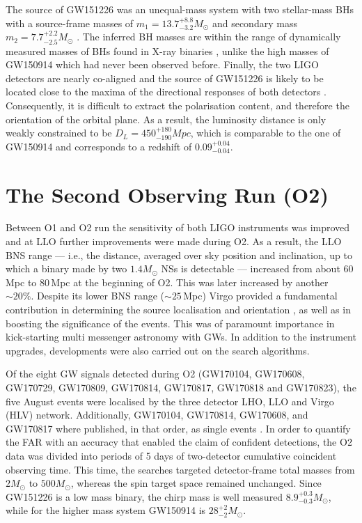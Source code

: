 \documentclass[binding=0.6cm, LaM]{sapthesis}
\begin{document}
	The source of GW151226 was an unequal-mass system with two stellar-mass BHs 
	with a source-frame masses of $m_1 = 13.7^{+8.8}_{-3.2}M_\odot$ 
	and secondary mass $m_2 = 7.7^{+2.2}_{-2.5}M_\odot$ \cite{13}. 
	The inferred BH masses are within the range of dynamically measured masses 
	of BHs found in X-ray binaries \cite{128, 129, 130, 132}, 
	unlike the high masses of GW150914 which had never been observed before. 
	Finally, the two LIGO detectors are nearly co-aligned and the source of GW151226 
	is likely to be located close to the maxima of the directional responses of both detectors \cite{28}. 
	Consequently, it is difficult to extract the polarisation content, and therefore the orientation of the orbital plane. 
	As a result, the luminosity distance is only weakly constrained to be $D_L = 450^{+180}_{-190}Mpc$, 
	which is comparable to the one of GW150914 and corresponds to a redshift of $0.09^{+0.04}_{-0.04}$.


\section{The Second Observing Run (O2)}
	Between O1 and O2 run the sensitivity of both LIGO instruments was improved and 
	at LLO further improvements were made during O2. 
	As a result, the LLO BNS range --- i.e., the distance, averaged over sky position and inclination, 
	up to which a binary made by two $1.4M_\odot$ NSs is detectable --- 
	increased from about 60\,Mpc to 80\,Mpc at the beginning of O2.
	This was later increased by another $\sim 20\%$.
 	Despite its lower BNS range ($\sim 25\,$Mpc) Virgo provided a fundamental contribution 
	in determining the source localisation and orientation \cite{56}, 
	as well as in boosting the significance of the events. 
	This was of paramount importance in kick-starting multi messenger astronomy with GWs.
	In addition to the instrument upgrades, developments were also carried out on
	the search algorithms.
 
	Of the eight GW signals detected during O2 
	(GW170104, GW170608, GW170729, GW170809, GW170814, GW170817, GW170818 and GW170823), 
	the five August events were localised by the three detector LHO, LLO and Virgo (HLV) network.
	Additionally, GW170104, GW170814, GW170608, and GW170817 where published, 
	in that order, as single events \cite{60,61,62,138}.
	In order to quantify the FAR with an accuracy that enabled the claim of confident detections, 
	the O2 data was divided into periods of 5 days of two-detector cumulative coincident observing time.
	This time, the searches targeted detector-frame total masses from $2M_\odot$ to $500 M_\odot$, 
	whereas the spin target space remained unchanged.
	Since GW151226 is a low mass binary, the chirp mass is well measured $8.9^{+0.3}_{-0.3} M_\odot$,
	while for the higher mass system GW150914 is $28^{+2}_{-2}M_\odot$.
\end{document}
